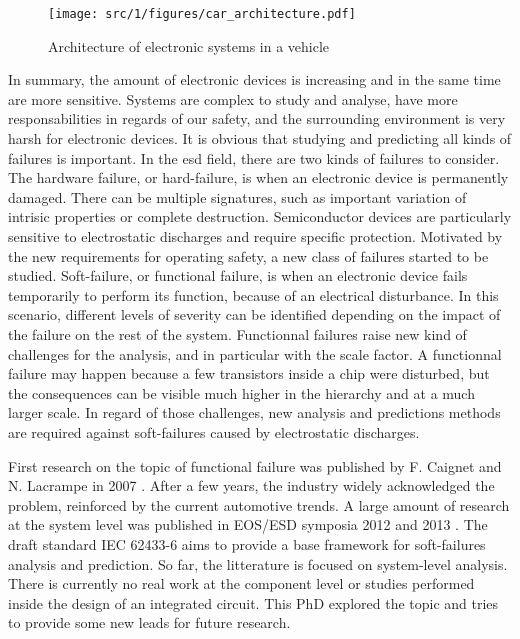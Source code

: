 \begin{figure}[!h]
  \centering
  \texttt{[image: src/1/figures/car\_architecture.pdf]}
  \caption{Architecture of electronic systems in a vehicle}
  \label{fig:car-architecture}
\end{figure}

In summary, the amount of electronic devices is increasing and in the same time are more sensitive.
Systems are complex to study and analyse, have more responsabilities in regards of our safety, and the surrounding environment is very harsh for electronic devices.
It is obvious that studying and predicting all kinds of failures is important.
In the \gls{esd} field, there are two kinds of failures to consider.
The hardware failure, or hard-failure, is when an electronic device is permanently damaged.
There can be multiple signatures, such as important variation of intrisic properties or complete destruction.
Semiconductor devices are particularly sensitive to electrostatic discharges \cite{impactESDsemiconductors} and require specific protection.
Motivated by the new requirements for operating safety, a new class of failures started to be studied.
Soft-failure, or functional failure, is when an electronic device fails temporarily to perform its function, because of an electrical disturbance.
In this scenario, different levels of severity can be identified depending on the impact of the failure on the rest of the system.
Functionnal failures raise new kind of challenges for the analysis, and in particular with the scale factor.
A functionnal failure may happen because a few transistors inside a chip were disturbed, but the consequences can be visible much higher in the hierarchy and at a much larger scale.
In regard of those challenges, new analysis and predictions methods are required against soft-failures caused by electrostatic discharges.

First research on the topic of functional failure was published by F. Caignet and N. Lacrampe in 2007 \cite{}.
After a few years, the industry widely acknowledged the problem, reinforced by the current automotive trends.
A large amount of research at the system level was published in EOS/ESD symposia 2012 \cite{} and 2013 \cite{}.
The draft standard IEC 62433-6 aims to provide a base framework for soft-failures analysis and prediction.
So far, the litterature is focused on system-level analysis.
There is currently no real work at the component level or studies performed inside the design of an integrated circuit.
This PhD explored the topic and tries to provide some new leads for future research.

